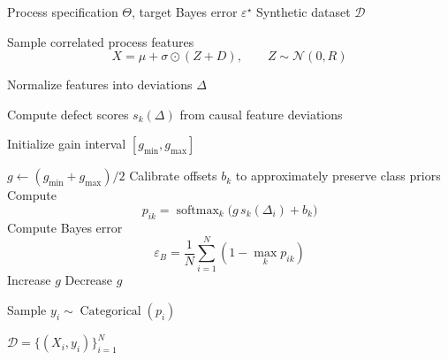 \begin{algorithm}[!htb]
\caption{Synthetic Process Sampling with Target Bayes Error}
\label{alg:generator}
\begin{algorithmic}[1]

\Require Process specification $\Theta$, target Bayes error $\varepsilon^\star$
\Ensure Synthetic dataset $\mathcal{D}$

\State Sample correlated process features
\[
    X = \mu + \sigma \odot (Z + D),
    \qquad Z \sim \mathcal{N}(0,R)
\]

\State Normalize features into deviations $\Delta$

\State Compute defect scores $s_k(\Delta)$ from causal feature deviations

\State Initialize gain interval $[g_{\min},g_{\max}]$

\Repeat
    \State $g \gets (g_{\min}+g_{\max})/2$
    \State Calibrate offsets $b_k$ to approximately preserve class priors
    \State Compute
    \[
        p_{ik}
        =
        \operatorname{softmax}_k
        \bigl(g\,s_k(\Delta_i)+b_k\bigr)
    \]
    \State Compute Bayes error
    \[
        \varepsilon_B
        =
        \frac{1}{N}\sum_{i=1}^{N}
        \left(1-\max_k p_{ik}\right)
    \]
        \State Increase $g$
    \Else
        \State Decrease $g$
    \EndIf
{}

    \State Sample $y_i \sim \operatorname{Categorical}(p_i)$
\EndFor

\State \Return $\mathcal{D}=\{(X_i,y_i)\}_{i=1}^{N}$

\end{algorithmic}
\end{algorithm}
